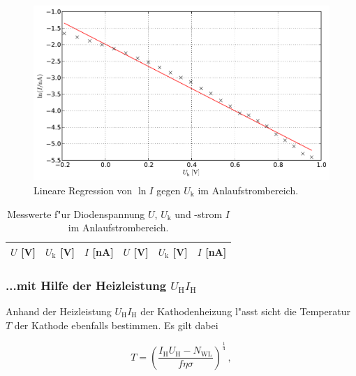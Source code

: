 			\begin{figure}[h!]
				\centering
				\includegraphics[width = 15cm]{img/messung2.pdf}
				\caption{Lineare Regression von $\ln{I}$ gegen $U_\mathrm{k}$ im Anlaufstrombereich.}
				\label{fig:messung2}
			\end{figure}

			\begin{table}[h!]
				\begin{center}
					\label{messung1}
					\caption{Messwerte f"ur Diodenspannung $U$, $U_\mathrm{k}$ und -strom $I$ im Anlaufstrombereich.}
					\begin{tabular}{|r|r|r||r|r|r|}
						\hline
							$U$ [V] & $U_\mathrm{k}$ [V] & $I$ [nA] & $U$ [V] & $U_\mathrm{k}$ [V] & $I$ [nA] \\
						\hline 
						\hline
							
						\hline 
					\end{tabular}
				\end{center}
			\end{table}

			\clearpage

		\subsubsection{...mit Hilfe der Heizleistung $U_\mathrm{H}I_\mathrm{H}$}
			\label{subsubsec:temp2}
			Anhand der Heizleistung $U_\mathrm{H}I_\mathrm{H}$ der Kathodenheizung l"asst sicht die Temperatur $T$ der Kathode ebenfalls bestimmen.
			Es gilt dabei

			\begin{equation*}
				T = \left(\frac{I_\mathrm{H}U_\mathrm{H} - N_\mathrm{WL}}{f \eta \sigma}\right)^{\frac{1}{4}}\,,
			\end{equation*}


